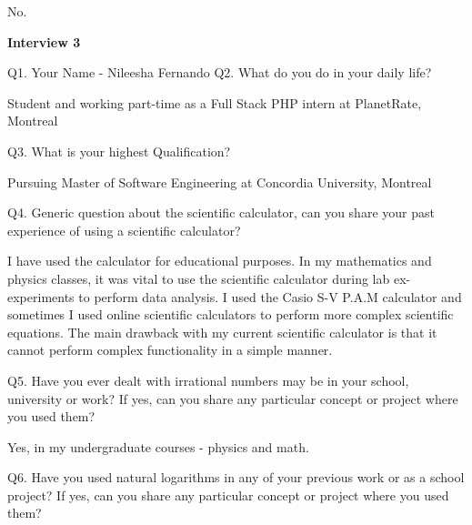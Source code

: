 \documentclass[12pt]{article}
\begin{document}
No.\par


\vspace{\baselineskip}

\vspace{\baselineskip}
\textbf{Interview 3}\par

Q1. Your Name - Nileesha Fernando Q2. What do you do in your daily life?\par

Student and working part-time as a Full Stack PHP intern at PlanetRate, Montreal\par


\vspace{\baselineskip}
Q3. What is your highest Qualification?\par

Pursuing Master of Software Engineering at Concordia University, Montreal\par


\vspace{\baselineskip}
Q4. Generic question about the scientific calculator, can you share your past experience of using a scientific calculator?\par

I have used the calculator for educational purposes. In my mathematics and physics classes, it was vital to use the scientific calculator during lab ex- experiments to perform data analysis. I used the Casio S-V P.A.M calculator and sometimes I used online scientific calculators to perform more complex scientific equations. The main drawback with my current scientific calculator is that it cannot perform complex functionality in a simple manner.\par


\vspace{\baselineskip}
Q5. Have you ever dealt with irrational numbers may be in your school, university or work? If yes, can you share any particular concept or project where you used them?\par

Yes, in my undergraduate courses - physics and math.\par


\vspace{\baselineskip}
Q6. Have you used natural logarithms in any of your previous work or as a school project? If yes, can you share any particular concept or project where you used them?\par
\end{document}
